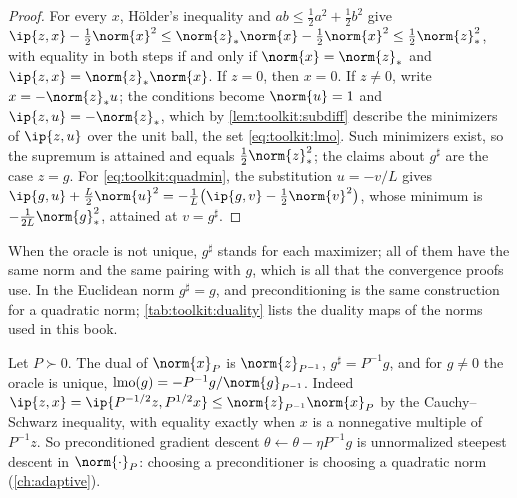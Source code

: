 \begin{refsection}
\begin{proof}
For every $x$, H\"older's inequality and $ab\le\frac12a^2+\frac12b^2$ give $\ip{z,x}-\frac12\norm{x}^2\le\norm{z}_*\norm{x}-\frac12\norm{x}^2\le\frac12\norm{z}_*^2$, with equality in both steps if and only if $\norm{x}=\norm{z}_*$ and $\ip{z,x}=\norm{z}_*\norm{x}$. If $z=0$, then $x=0$. If $z\ne0$, write $x=-\norm{z}_*u$; the conditions become $\norm{u}=1$ and $\ip{z,u}=-\norm{z}_*$, which by \cref{lem:toolkit:subdiff} describe the minimizers of $\ip{z,u}$ over the unit ball, the set \eqref{eq:toolkit:lmo}. Such minimizers exist, so the supremum is attained and equals $\frac12\norm{z}_*^2$; the claims about $g^\sharp$ are the case $z=g$. For \eqref{eq:toolkit:quadmin}, the substitution $u=-v/L$ gives $\ip{g,u}+\frac L2\norm{u}^2=-\frac1L\bigl(\ip{g,v}-\frac12\norm{v}^2\bigr)$, whose minimum is $-\frac1{2L}\norm{g}_*^2$, attained at $v=g^\sharp$.
\end{proof}

When the oracle is not unique, $g^\sharp$ stands for each maximizer; all of them have the same norm and the same pairing with $g$, which is all that the convergence proofs use. In the Euclidean norm $g^\sharp=g$, and preconditioning is the same construction for a quadratic norm; \cref{tab:toolkit:duality} lists the duality maps of the norms used in this book.

\begin{example}\label{exa:toolkit:quadnorm}
Let $P\succ0$. The dual of $\norm{x}_P$ is $\norm{z}_{P^{-1}}$, $g^\sharp=P^{-1}g$, and for $g\ne0$ the oracle is unique, $\lmo(g)=-P^{-1}g/\norm{g}_{P^{-1}}$. Indeed $\ip{z,x}=\ip{P^{-1/2}z,P^{1/2}x}\le\norm{z}_{P^{-1}}\norm{x}_P$ by the Cauchy--Schwarz inequality, with equality exactly when $x$ is a nonnegative multiple of $P^{-1}z$. So preconditioned gradient descent $\theta\leftarrow\theta-\eta P^{-1}g$ is unnormalized steepest descent in $\norm{\cdot}_P$: choosing a preconditioner is choosing a quadratic norm (\cref{ch:adaptive}).
\end{example}


\end{refsection}
